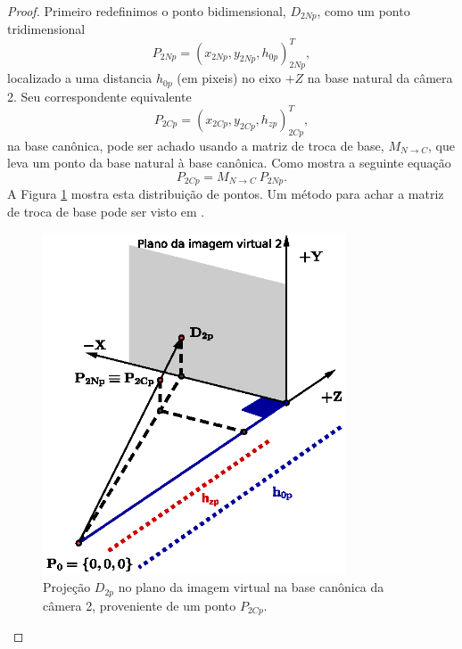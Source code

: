 \documentclass[a4paper,10pt]{article}
\begin{document}
\begin{proof}
Primeiro redefinimos o ponto bidimensional, $D_{2Np}$, como um ponto tridimensional
\begin{equation}\label{eq:cam1b}
 P_{2Np}=(x_{2Np},y_{2Np},h_{0p})^T_{2Np},
\end{equation}
localizado a uma distancia $h_{0p}$ (em pixeis) no eixo $+Z$
na base natural da câmera 2. Seu correspondente equivalente
\begin{equation}\label{eq:cam1a}
 P_{2Cp}=(x_{2Cp},y_{2Cp},h_{zp})^T_{2Cp},
\end{equation}
na base canônica, pode ser achado usando a matriz de 
troca de base, $M_{N \rightarrow C}$, que leva um ponto da base natural à base canônica.
Como mostra a seguinte equação
\begin{equation}\label{eq:cam2}
 P_{2Cp} =M_{N \rightarrow C}~P_{2Np}.
\end{equation}
A Figura \ref{fig:model2} mostra esta distribuição de pontos.
Um método para achar a matriz de troca de base pode ser visto em \cite{cambiobase}.

\begin{figure}[!]
\center
 \includegraphics[width=9.0cm]{./images/projetadndo.eps}
\caption{Projeção $D_{2p}$ no plano da imagem virtual na base canônica da câmera 2, proveniente de um ponto $P_{2Cp}$.}
\label{fig:model2}
\end{figure} 


\end{proof}
\end{document}

